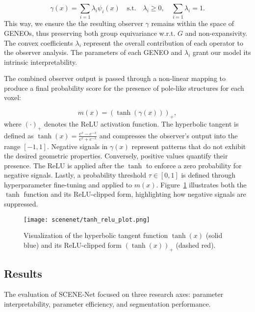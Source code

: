 \begin{equation}
      \gamma(x) = \sum_{i=1} \lambda_i \psi_i(x) \quad \text{s.t.} \quad \lambda_i \geq 0, \quad \sum_{i=1} \lambda_i = 1.
\end{equation}
%
This way, we ensure the the resulting observer $\gamma$ remains within the
space of GENEOs, thus preserving both group equivariance w.r.t. $G$ and
non-expansivity. The convex coefficients $\lambda_i$ represent the overall
contribution of each operator to the observer analysis. The parameters of each
GENEO and $\lambda_i$ grant our model its intrinsic interpretability.

The combined observer output is passed through a non-linear mapping to produce
a final probability score for the presence of pole-like structures for each
voxel:

\begin{equation}
      m(x) = {\left(\tanh(\gamma(x))\right)}_+,
\end{equation}
%
where ${(\cdot)}_+$ denotes the ReLU activation function. The hyperbolic
tangent is defined as $\tanh(x) = \frac{e^x - e^{-x}}{e^x + e^{-x}}$ and compresses the
observer’s output into the range $[-1, 1]$.
% 
Negative signals in $\gamma(x)$ represent patterns that do not exhibit the
desired geometric properties. Conversely, positive values quantify their
presence. The ReLU is applied after the $\tanh$ to enforce a zero probability for
negative signals. Lastly, a probability threshold $\tau \in [0, 1]$ is defined
through hyperparameter fine-tuning and applied to $m(x)$.
%
Figure~\ref{fig:tanh-relu-plot}
illustrates both the $\tanh$ function and its ReLU-clipped form, highlighting
how negative signals are suppressed.
%
\begin{figure}[ht]
    \centering
    \texttt{[image: scenenet/tanh\_relu\_plot.png]}
    \caption{Visualization of the hyperbolic tangent function $\tanh(x)$ (solid blue) and its ReLU-clipped form $(\tanh(x))_+$ (dashed red).}
    \label{fig:tanh-relu-plot}
\end{figure}

\subsection{Results}

The evaluation of SCENE-Net focused on three research axes: parameter
interpretability, parameter efficiency, and segmentation performance.


